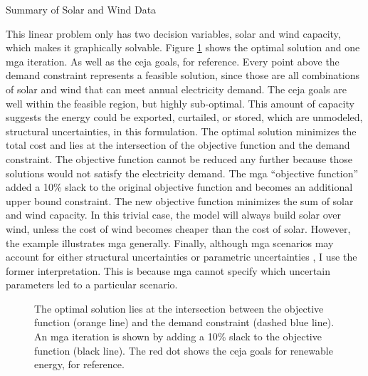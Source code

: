 \begin{table}[H]
  \centering
  \caption{Summary of Solar and Wind Data}
  \label{tab:naive}
  \resizebox{0.75\textwidth}{!}{
  
  }
\end{table}

This linear problem only has two decision variables, solar and wind capacity,
which makes it graphically solvable. Figure \ref{fig:mga-fig} shows the optimal
solution and one \gls{mga} iteration. As well as the \gls{ceja} goals, for reference.
Every point above the demand constraint represents a feasible solution, since
those are all combinations of solar and wind that can meet annual electricity
demand. The \gls{ceja} goals are well within the feasible region, but highly sub-optimal.
This amount of capacity suggests the energy could be exported, curtailed, or stored, which are
unmodeled, structural uncertainties, in this formulation.
The optimal solution minimizes the total cost and lies at the intersection
of the objective function and the demand constraint. The objective function cannot
be reduced any further because those solutions would not satisfy the electricity demand.
The \gls{mga} ``objective function'' added a 10\% slack to the original objective function
and becomes an additional upper bound constraint. The new objective function minimizes
the sum of solar and wind capacity. In this trivial case, the model will always build
solar over wind, unless the cost of wind becomes cheaper than the cost of solar.
However, the example illustrates \gls{mga} generally. Finally, although \gls{mga} scenarios
may account for either structural uncertainties or parametric uncertainties
\cite{decarolis_modelling_2016}, I use the former interpretation. This is because
\gls{mga} cannot specify which uncertain parameters led to a particular scenario.
\begin{figure}[H]
  \centering
  \resizebox{0.8\columnwidth}{!}{}
  \caption{The optimal solution lies at the intersection between the objective
  function (orange line) and the demand constraint (dashed blue line). An \gls{mga}
  iteration is shown by adding a 10\% slack to the objective function (black line).
  The red dot shows the \gls{ceja} goals for renewable energy, for reference.}
  \label{fig:mga-fig}
\end{figure}

